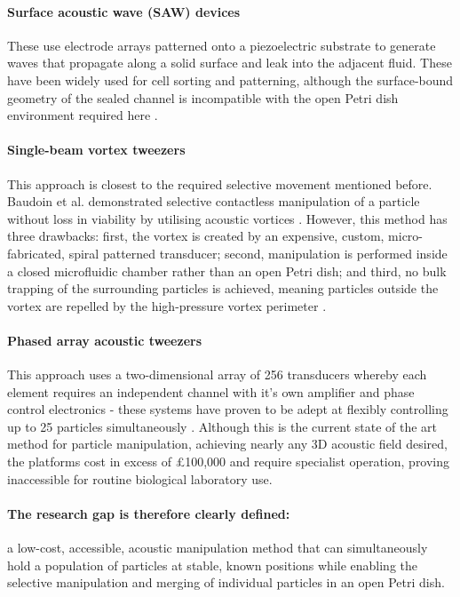 \documentclass[11pt,a4paper]{article}
\begin{document}
\paragraph{Surface acoustic wave (SAW) devices} These use electrode arrays patterned onto a piezoelectric substrate to generate waves that propagate along a solid surface and leak into the adjacent fluid. These have been widely used for cell sorting and patterning, although the surface-bound geometry of the sealed channel is incompatible with the open Petri dish environment required here \cite{qin2024saw, ding2013saw}.

\paragraph{Single-beam vortex tweezers}
This approach is closest to the required selective movement mentioned before. Baudoin et al. demonstrated selective contactless manipulation of a particle without loss in viability by utilising acoustic vortices \cite{baudoin2020acoustical}. However, this method has three drawbacks: first, the vortex is created by an expensive, custom, micro-fabricated, spiral patterned transducer; second,  manipulation is performed inside a closed microfluidic chamber rather than an open Petri dish; and third, no bulk trapping of the surrounding particles is achieved, meaning particles outside the vortex are repelled by the high-pressure vortex perimeter \cite{baudoin2020acoustical}.

\paragraph{Phased array acoustic tweezers}
This approach uses a two-dimensional array of 256 transducers whereby each element requires an independent channel with it's own amplifier and phase control electronics - these systems have proven to be adept at flexibly controlling up to 25 particles simultaneously \cite{marzo2019holographicPNAS}. Although this is the current state of the art method for particle manipulation, achieving nearly any 3D acoustic field desired, the platforms cost in excess of £100,000 and require specialist operation, proving inaccessible for routine biological laboratory use. 

\paragraph{The research gap is therefore clearly defined:} a low-cost, accessible, acoustic manipulation method that can simultaneously hold a population of particles at stable, known positions while enabling the selective manipulation and merging of individual particles in an open Petri dish.
\end{document}
